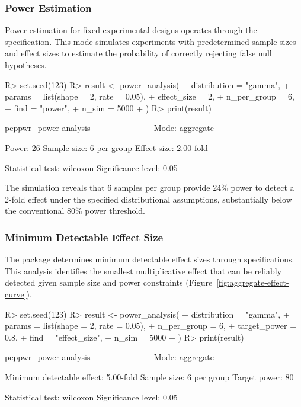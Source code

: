 \documentclass[article]{jss}
\begin{document}
\subsubsection{Power Estimation}

Power estimation for fixed experimental designs operates through the  specification. This mode simulates experiments with predetermined sample sizes and effect sizes to estimate the probability of correctly rejecting false null hypotheses.

\begin{Schunk}
\begin{Sinput}
R> set.seed(123)
R> result <- power_analysis(
+    distribution = "gamma",
+    params = list(shape = 2, rate = 0.05),
+    effect_size = 2,
+    n_per_group = 6,
+    find = "power",
+    n_sim = 5000
+  )
R> print(result)
\end{Sinput}
\begin{Soutput}
peppwr_power analysis
---------------------
Mode: aggregate

Power: 26%
Sample size: 6 per group
Effect size: 2.00-fold

Statistical test: wilcoxon
Significance level: 0.05
\end{Soutput}
\end{Schunk}

The simulation reveals that 6 samples per group provide 24\% power to detect a 2-fold effect under the specified distributional assumptions, substantially below the conventional 80\% power threshold.

\subsubsection{Minimum Detectable Effect Size}

The package determines minimum detectable effect sizes through  specifications. This analysis identifies the smallest multiplicative effect that can be reliably detected given sample size and power constraints (Figure~\ref{fig:aggregate-effect-curve}).

\begin{Schunk}
\begin{Sinput}
R> set.seed(123)
R> result <- power_analysis(
+    distribution = "gamma",
+    params = list(shape = 2, rate = 0.05),
+    n_per_group = 6,
+    target_power = 0.8,
+    find = "effect_size",
+    n_sim = 5000
+  )
R> print(result)
\end{Sinput}
\begin{Soutput}
peppwr_power analysis
---------------------
Mode: aggregate

Minimum detectable effect: 5.00-fold
Sample size: 6 per group
Target power: 80%

Statistical test: wilcoxon
Significance level: 0.05
\end{Soutput}
\end{Schunk}
\end{document}
